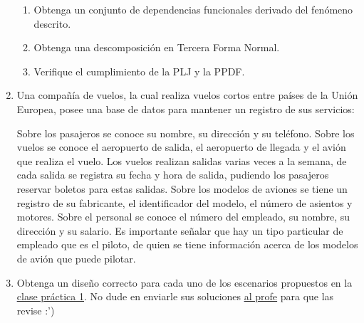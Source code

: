 \documentclass{article}
\begin{document}
\begin{enumerate}
\begin{enumerate}
    \item Obtenga un conjunto de dependencias funcionales derivado del fenómeno descrito.
    \item Obtenga una descomposición en Tercera Forma Normal.
    \item Verifique el cumplimiento de la PLJ y la PPDF.
\end{enumerate}	

\item Una compa\~n\'ia de vuelos, la cual realiza vuelos cortos entre pa\'ises de la Uni\'on Europea, posee una base de datos para mantener un registro de sus servicios:


Sobre los pasajeros se conoce su nombre, su direcci\'on y su tel\'efono. Sobre los vuelos se conoce el aeropuerto de salida, el aeropuerto de llegada y el avi\'on que realiza el vuelo. Los vuelos realizan salidas varias veces a la semana, de cada salida se registra su fecha y hora de salida, pudiendo los pasajeros reservar boletos para estas salidas. Sobre los modelos de aviones se tiene un registro de su fabricante, el identificador del modelo, el n\'umero de asientos y motores. Sobre el personal se conoce el n\'umero del empleado, su nombre, su direcci\'on y su salario. Es importante se\~nalar que hay un tipo particular de empleado que es el piloto, de quien se tiene informaci\'on acerca de los modelos de avi\'on que puede pilotar.


\item Obtenga un diseño correcto para cada uno de los escenarios propuestos en la \textcolor{blue}{\underline{\href{https://t.me/matcom_database_ds/9}{clase práctica 1}}}. No dude en enviarle sus soluciones \textcolor{blue}{\underline{\href{https://t.me/andyRsdEla}{al profe}}} para que las revise :')

\end{enumerate}
\end{document}
